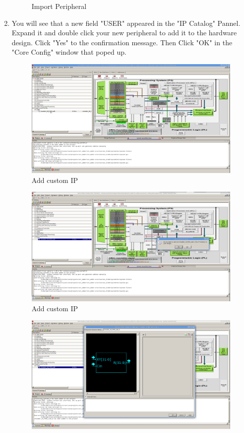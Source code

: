 \documentclass{article}
\begin{document}
\begin{enumerate}
\begin{figure}
	\caption{Import Peripheral}
	\end{figure}
	\item You will see that a new field "USER" appeared in the "IP Catalog" Pannel.
	Expand it and double click your new peripheral to add it to the hardware
	design. Click "Yes" to the confirmation message. Then Click "OK" in the "Core
	Config" window that poped up.
	\begin{figure}
	\includegraphics[scale=0.25]{pictures/AddPeripheral1.png}
	\caption{Add custom IP}
	\end{figure}
	\begin{figure}
	\includegraphics[scale=0.25]{pictures/AddPeripheral2.png}
	\caption{Add custom IP}
	\end{figure}
	\begin{figure}
	\includegraphics[scale=0.25]{pictures/AddPeripheral3.png}

\end{figure}
\end{enumerate}
\end{document}
